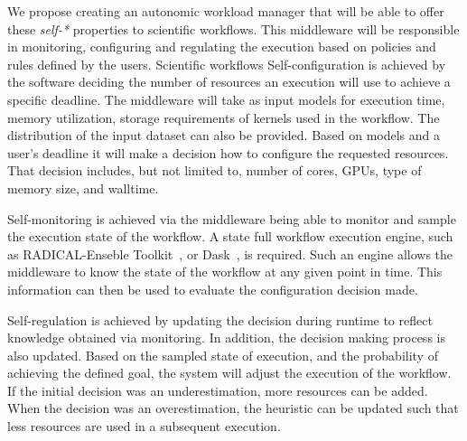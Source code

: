We propose creating an autonomic workload manager that will be able to offer these 
\textit{self-*} properties to scientific workflows. This middleware will be 
responsible in monitoring, configuring and regulating the execution based on 
policies and rules defined by the users. 
Scientific workflows 
Self-configuration is achieved by the software deciding the number of resources 
an execution will use to achieve a specific deadline. The middleware will take 
as input models for execution time, memory utilization, storage requirements of 
kernels used in the workflow. The distribution of the input dataset can also be 
provided. Based on models and a user's deadline it will make a decision how to 
configure the requested resources. That decision includes, but not limited to, 
number of cores, GPUs, type of memory size, and walltime.

Self-monitoring is achieved via the middleware being able to monitor and sample 
the execution state of the workflow. A state full workflow execution engine, such as 
RADICAL-Enseble Toolkit~\cite{balasubramanian2018harnessing}, or Dask~\cite{rocklin2015dask}, 
is required. Such an engine allows the middleware to know the state of the workflow 
at any given point in time. This information can then be used to evaluate the 
configuration decision made.

Self-regulation is achieved by updating the decision during runtime to reflect 
knowledge obtained via monitoring. In addition, the decision making process 
is also updated. Based on the sampled state of execution, and the probability 
of achieving the defined goal, the system will adjust the execution of the 
workflow. If the initial decision was an underestimation, 
more resources can be added. When the decision was an overestimation, the heuristic 
can be updated such that less resources are used in a subsequent execution.


